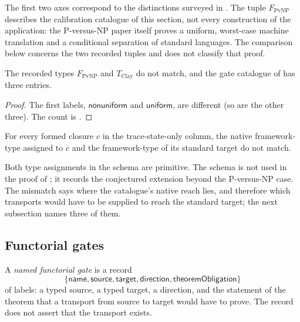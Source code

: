 The first two axes correspond to the distinctions surveyed in
\cite{Impagliazzo1995FiveWorlds}.  The tuple \(F_{\mathrm{PvNP}}\)
describes the calibration catalogue of this section, not every
construction of the application: the P-versus-NP paper itself proves a
uniform, worst-case machine translation and a conditional separation of
standard languages.  The comparison below concerns the two recorded
tuples and does not classify that proof.

\begin{theorem}\label{thm:framework-type-self-char}
The recorded types \(F_{\mathrm{PvNP}}\) and \(T_{\mathrm{Clay}}\) do not
match, and the gate catalogue of  has
three entries.
\end{theorem}

\begin{proof}
The first labels, \(\mathsf{nonuniform}\) and \(\mathsf{uniform}\), are
different (so are the other three).  The count is
.
\end{proof}

\begin{schema}\label{sch:framework-type-pending}
For every formed closure \(c\) in the trace-state-only column, the
native framework-type assigned to \(c\) and the framework-type of its
standard target do not match.
\end{schema}

Both type assignments in the schema are primitive.  The schema is not
used in the proof of ; it records the
conjectured extension beyond the P-versus-NP case.  The mismatch says
where the catalogue's native reach lies, and therefore which transports
would have to be supplied to reach the standard target; the next
subsection names three of them.

\subsection{Functorial gates}\label{sec:calibration:functorial-gates}

\begin{definition}\label{def:functorial-gate}
A \emph{named functorial gate} is a record
\[
  \{\mathsf{name},\mathsf{source},\mathsf{target},\mathsf{direction},\mathsf{theoremObligation}\}
\]
of labels: a typed source, a typed target, a direction, and the
statement of the theorem that a transport from source to target would
have to prove.  The record does not assert that the transport exists.
\end{definition}

